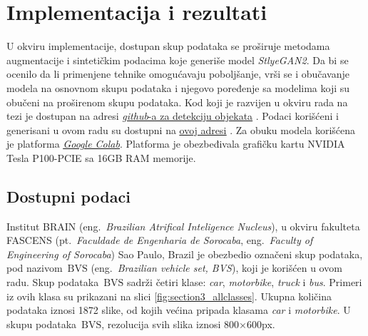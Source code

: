 \documentclass[12pt,oneside]{memoir}
\newcommand{\bvs}{\ensuremath{\,\textrm{BVS}}}
\begin{document}

\chapter{Implementacija i rezultati}
\label{section5}

U okviru implementacije, dostupan skup podataka se proširuje metodama augmentacije i sintetičkim podacima koje generiše model \textit{StlyeGAN2}.
Da bi se ocenilo da li primenjene tehnike omogućavaju poboljšanje, vrši se i obučavanje modela na osnovnom skupu podataka i njegovo poređenje sa modelima koji su obučeni na proširenom skupu podataka.
Kod koji je razvijen u okviru rada na tezi je dostupan na adresi  \underline{\href{https://github.com/Grula/vehicle-detection}{\textit{github}-a za detekciju objekata}} \cite{vehicleGit2022}. Podaci korišćeni i generisani u ovom radu su dostupni na \href{https://drive.google.com/file/d/1EkrO28-iBCVWyPqy5mJXn8P8EoKQ6xUH/view?usp=sharing}{\underline{ovoj adresi}} \cite{vehicleData2022}. Za obuku modela korišćena je platforma \href{https://research.google.com/colaboratory/}{\underline{\textit{Google Colab}}}. Platforma je obezbeđivala grafičku kartu NVIDIA Tesla P100-PCIE sa 16GB RAM memorije. 


\section{Dostupni podaci}

Institut BRAIN (eng.~\textit{Brazilian Atrifical Inteligence Nucleus}), u okviru fakulteta FASCENS (pt.~\textit{Faculdade de Engenharia de Sorocaba}, eng.~\textit{Faculty of Engineering of Sorocaba}) Sao Paulo, Brazil je obezbedio označeni skup podataka, pod nazivom \bvs{} (eng.~\textit{Brazilian vehicle set, BVS}), koji je korišćen u ovom radu. Skup podataka \bvs{} sadrži četiri klase: \textit{car}, \textit{motorbike}, \textit{truck} i \textit{bus}. Primeri iz ovih klasa su prikazani na slici \ref{fig:section3_allclasses}. Ukupna količina podataka iznosi 1872 slike, od kojih većina pripada klasama \textit{car} i \textit{motorbike}. U skupu podataka \bvs, rezolucija svih slika iznosi 800$\times$600px. 
\end{document}
